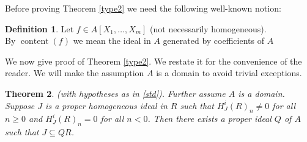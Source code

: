 \documentclass{amsart}
\newcommand{\content}{\operatorname{content}}
\theoremstyle{plain}
\newtheorem{theorem}{Theorem}[section]
\theoremstyle{definition}
\newtheorem{definition}[theorem]{Definition}
\theoremstyle{remark}
\begin{document}
Before proving Theorem \ref{type2} we need the following well-known notion:
\begin{definition}
Let $f \in A[X_1,\ldots, X_m]$ (not necessarily homogeneous). \\ By $\content(f)$ we mean the ideal in $A$ generated by coefficients of $A$
\end{definition}
We now give proof of Theorem \ref{type2}. We restate it for the convenience of the reader. We will make the assumption $A$ is a domain to avoid trivial exceptions.
\begin{theorem}\label{type2-pr}
(with hypotheses as in \ref{std}). Further assume $A$ is a domain.
Suppose $J$ is a proper homogeneous ideal in $R$ such that $H^i_J(R)_n \neq 0$ for all $n \geq 0$ and $H^i_J(R)_n = 0$ for all $n < 0$. Then there exists a proper ideal $Q$ of $A$ such that $J \subseteq QR$.
\end{theorem}
\end{document}
